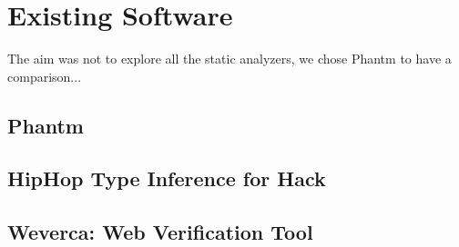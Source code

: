 \chapter{Existing Software}
    The aim was not to explore all the static analyzers, we chose Phantm to have a comparison...


    \section{Phantm\cite{kneuss2010using}}
    
    \section{HipHop Type Inference for Hack}
    
    \section{Weverca: Web Verification Tool\cite{hauzarhunting}}
